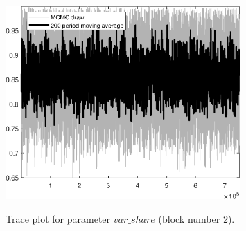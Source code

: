 \begin{figure}[H]
\centering
  \includegraphics[width=0.8\textwidth]{directed_search_est/graphs/TracePlot_var_share_blck_2}\\
    \caption{Trace plot for parameter $var\_share$ (block number 2).}
\end{figure}
